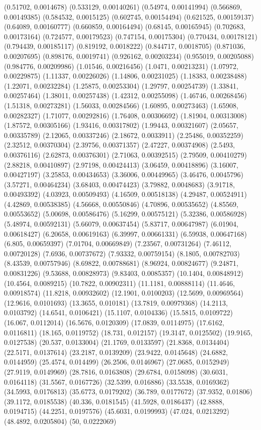 {(0.51702, 0.0014678)
(0.533129, 0.00140261)
(0.54974, 0.00141994)
(0.566869, 0.00149385)
(0.584532, 0.0015125)
(0.602745, 0.00154494)
(0.621525, 0.00159137)
(0.64089, 0.00160777)
(0.660859, 0.00164494)
(0.68145, 0.00165945)
(0.702683, 0.00173164)
(0.724577, 0.00179523)
(0.747154, 0.00175304)
(0.770434, 0.00178121)
(0.794439, 0.00185117)
(0.819192, 0.0018222)
(0.844717, 0.0018705)
(0.871036, 0.00207695)
(0.898176, 0.0019741)
(0.926162, 0.00203234)
(0.955019, 0.00205088)
(0.984776, 0.00209986)
(1.01546, 0.00216456)
(1.0471, 0.00213231)
(1.07972, 0.00229875)
(1.11337, 0.00226026)
(1.14806, 0.00231025)
(1.18383, 0.00238488)
(1.22071, 0.00232284)
(1.25875, 0.00253304)
(1.29797, 0.00254739)
(1.33841, 0.00257464)
(1.38011, 0.00257438)
(1.42312, 0.00255098)
(1.46746, 0.00268456)
(1.51318, 0.00273281)
(1.56033, 0.00284566)
(1.60895, 0.00273463)
(1.65908, 0.00282327)
(1.71077, 0.00292816)
(1.76408, 0.00306692)
(1.81904, 0.00313008)
(1.87572, 0.00305166)
(1.93416, 0.00317802)
(1.99443, 0.00321607)
(2.05657, 0.00335789)
(2.12065, 0.00337246)
(2.18672, 0.0033911)
(2.25486, 0.00352259)
(2.32512, 0.00370304)
(2.39756, 0.00371357)
(2.47227, 0.00374908)
(2.5493, 0.00376116)
(2.62873, 0.00376301)
(2.71063, 0.00392515)
(2.79509, 0.00410279)
(2.88218, 0.00410897)
(2.97198, 0.00424413)
(3.06459, 0.00418896)
(3.16007, 0.00427197)
(3.25853, 0.00434653)
(3.36006, 0.00449965)
(3.46476, 0.0045796)
(3.57271, 0.00464234)
(3.68403, 0.00474423)
(3.79882, 0.0048683)
(3.91718, 0.00493392)
(4.03923, 0.00509493)
(4.16509, 0.00518138)
(4.29487, 0.00524911)
(4.42869, 0.00538385)
(4.56668, 0.00550846)
(4.70896, 0.00535652)
(4.85569, 0.00553652)
(5.00698, 0.00586476)
(5.16299, 0.00575121)
(5.32386, 0.00586928)
(5.48974, 0.00592131)
(5.66079, 0.00637454)
(5.83717, 0.00647987)
(6.01904, 0.00618427)
(6.20658, 0.00619163)
(6.39997, 0.00661331)
(6.59938, 0.00647168)
(6.805, 0.00659397)
(7.01704, 0.00669849)
(7.23567, 0.00731264)
(7.46112, 0.00720128)
(7.6936, 0.00737672)
(7.93332, 0.00759154)
(8.1805, 0.00782703)
(8.43539, 0.00757946)
(8.69822, 0.00788681)
(8.96924, 0.00824677)
(9.24871, 0.00831226)
(9.53688, 0.00828973)
(9.83403, 0.0085357)
(10.1404, 0.00848912)
(10.4564, 0.0089215)
(10.7822, 0.00902311)
(11.1181, 0.00888114)
(11.4646, 0.00918574)
(11.8218, 0.00932602)
(12.1901, 0.0100203)
(12.5699, 0.00969564)
(12.9616, 0.0101693)
(13.3655, 0.010181)
(13.7819, 0.00979368)
(14.2113, 0.0103792)
(14.6541, 0.0106421)
(15.1107, 0.0104336)
(15.5815, 0.0109722)
(16.067, 0.0112014)
(16.5676, 0.0120309)
(17.0839, 0.0114975)
(17.6162, 0.0116811)
(18.165, 0.0119752)
(18.731, 0.012157)
(19.3147, 0.0125502)
(19.9165, 0.0127538)
(20.537, 0.0133004)
(21.1769, 0.0133597)
(21.8368, 0.0134404)
(22.5171, 0.0137614)
(23.2187, 0.0139209)
(23.9422, 0.0145648)
(24.6882, 0.0144959)
(25.4574, 0.014499)
(26.2506, 0.0146967)
(27.0685, 0.0152949)
(27.9119, 0.0149969)
(28.7816, 0.0163808)
(29.6784, 0.0158098)
(30.6031, 0.0164118)
(31.5567, 0.0167726)
(32.5399, 0.016886)
(33.5538, 0.0169362)
(34.5993, 0.0176813)
(35.6773, 0.0179202)
(36.789, 0.0177672)
(37.9352, 0.01806)
(39.1172, 0.0185538)
(40.336, 0.0181545)
(41.5928, 0.0186437)
(42.8888, 0.0194715)
(44.2251, 0.0197576)
(45.6031, 0.0199993)
(47.024, 0.0213292)
(48.4892, 0.0205804)
(50, 0.0222069)
}

